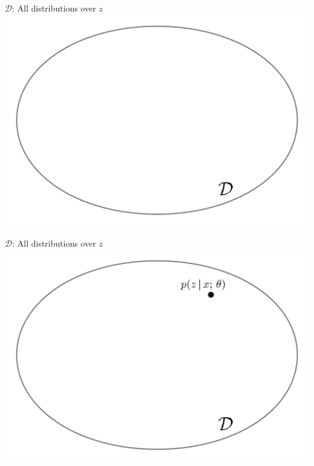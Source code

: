\begin{frame}
$\mathcal{D}$: All distributions over $z$ \\
\center
\includegraphics[scale=0.26]{pics/vi1.png}
\end{frame}

\begin{frame}
$\mathcal{D}$: All distributions over $z$ \\
\center
\includegraphics[scale=0.26]{pics/vi2.png}
\end{frame}


